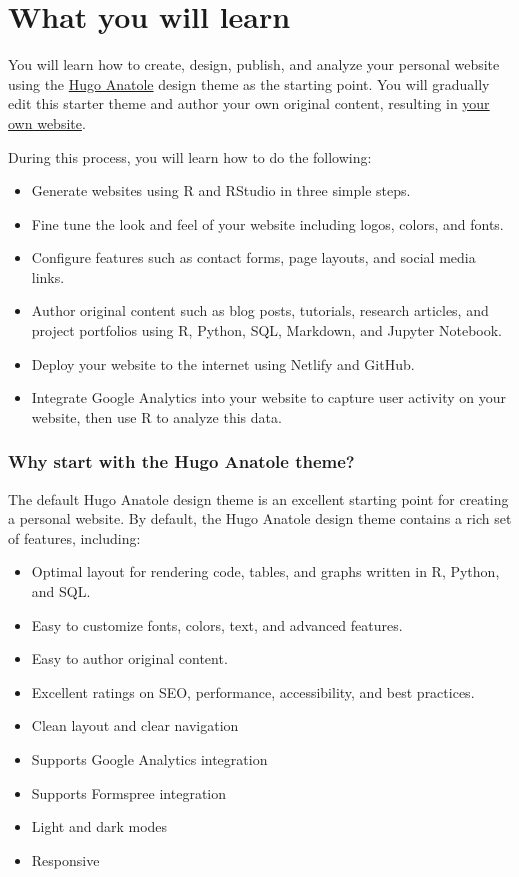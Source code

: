 \documentclass[
]{book}
\providecommand{\tightlist}{%
  \setlength{\itemsep}{0pt}\setlength{\parskip}{0pt}}
\begin{document}
\hypertarget{learn}{%
\section{What you will learn}\label{learn}}

You will learn how to create, design, publish, and analyze your personal website using the \href{https://themes.gohugo.io/theme/anatole/}{Hugo Anatole} design theme as the starting point. You will gradually edit this starter theme and author your own original content, resulting in \href{https://r4sites-anatole-custom.netlify.app/}{your own website}.

During this process, you will learn how to do the following:

\begin{itemize}
\tightlist
\item
  Generate websites using R and RStudio in three simple steps.
\item
  Fine tune the look and feel of your website including logos, colors, and fonts.
\item
  Configure features such as contact forms, page layouts, and social media links.
\item
  Author original content such as blog posts, tutorials, research articles, and project portfolios using R, Python, SQL, Markdown, and Jupyter Notebook.
\item
  Deploy your website to the internet using Netlify and GitHub.
\item
  Integrate Google Analytics into your website to capture user activity on your website, then use R to analyze this data.
\end{itemize}

\hypertarget{anatole}{%
\subsubsection*{Why start with the Hugo Anatole theme?}\label{anatole}}

The default Hugo Anatole design theme is an excellent starting point for creating a personal website. By default, the Hugo Anatole design theme contains a rich set of features, including:

\begin{itemize}
\tightlist
\item
  Optimal layout for rendering code, tables, and graphs written in R, Python, and SQL.
\item
  Easy to customize fonts, colors, text, and advanced features.
\item
  Easy to author original content.
\item
  Excellent ratings on SEO, performance, accessibility, and best practices.
\item
  Clean layout and clear navigation
\item
  Supports Google Analytics integration
\item
  Supports Formspree integration
\item
  Light and dark modes
\item
  Responsive
\end{itemize}
\end{document}
